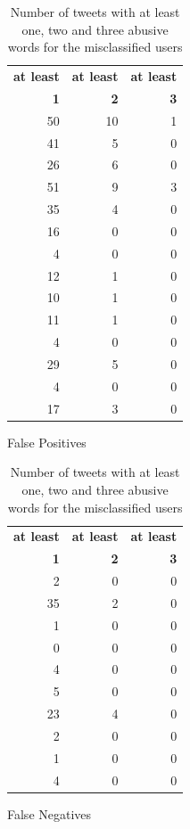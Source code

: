 \begin{table}[htbp]
\centering
\begin{subtable}{0.4\textwidth}
\centering
\begin{tabular}{rrr}
\hline
\multicolumn{1}{c}{\textbf{at least}} & \multicolumn{1}{c}{\textbf{at least}} & \multicolumn{1}{c}{\textbf{at least}} \\
\multicolumn{1}{r}{\textbf{1}} & \multicolumn{1}{r}{\textbf{2}} & \multicolumn{1}{r}{\textbf{3}} \\ \hline
50 & 10 & 1 \\
41 & 5 & 0 \\
26 & 6 & 0 \\
51 & 9 & 3 \\
35 & 4 & 0 \\
16 & 0 & 0 \\
4 & 0 & 0 \\
12 & 1 & 0 \\
10 & 1 & 0 \\
11 & 1 & 0 \\
4 & 0 & 0 \\
29 & 5 & 0 \\
4 & 0 & 0 \\
17 & 3 & 0 \\ \hline
\end{tabular}
\caption{False Positives}
\end{subtable}
\begin{subtable}{0.4\textwidth}
\centering
\begin{tabular}{rrr}
\hline
\multicolumn{1}{c}{\textbf{at least}} & \multicolumn{1}{c}{\textbf{at least}} & \multicolumn{1}{c}{\textbf{at least}} \\
\multicolumn{1}{r}{\textbf{1}} & \multicolumn{1}{r}{\textbf{2}} & \multicolumn{1}{r}{\textbf{3}} \\ \hline
2 & 0 & 0 \\
35 & 2 & 0 \\
1 & 0 & 0 \\
0 & 0 & 0 \\
4 & 0 & 0 \\
5 & 0 & 0 \\
23 & 4 & 0 \\
2 & 0 & 0 \\
1 & 0 & 0 \\
4 & 0 & 0 \\ \hline
\end{tabular}
\caption{False Negatives}
\end{subtable}
\caption{Number of tweets with at least one, two and three abusive words for the misclassified users}
\label{tab:err-ana:our_model:abusive}
\end{table}

